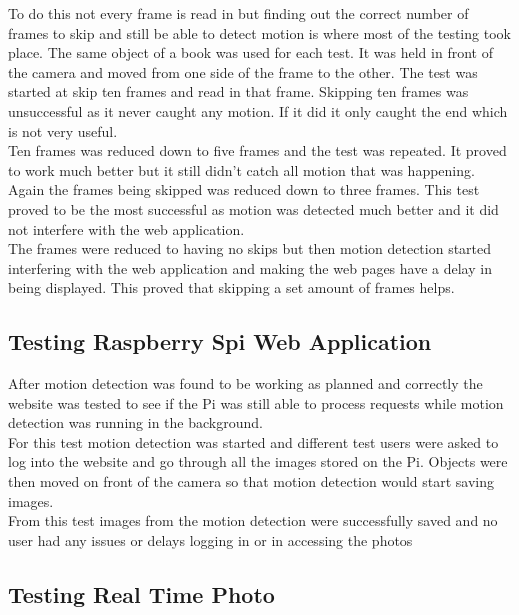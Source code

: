\documentclass[]{report}
\begin{document}
 To do this not every frame is read in but finding out the correct number of frames to skip and still be able to detect motion is where most of the testing took place. The same object of a book was used for each test. It was held in front of the camera and moved from one side of the frame to the other. The test was started at skip ten frames and read in that frame. Skipping ten frames was unsuccessful as it never caught any motion. If it did it only caught the end which is not very useful. \\

Ten frames was reduced down to five frames and the test was repeated. It proved to work much better but it still didn’t catch all motion that was happening. Again the frames being skipped was reduced down to three frames. This test proved to be the most successful as motion was detected much better and it did not interfere with the web application. \\

The frames were reduced to having no skips but then motion detection started interfering with the web application and making the web pages have a delay in being displayed. This proved that skipping a set amount of frames helps.\\

\subsection{Testing Raspberry Spi Web Application}
\label{subsec:websiteTest}
%
After motion detection was found to be working as planned and correctly the website was tested to see if the Pi was still able to process requests while motion detection was running in the background.\\

For this test motion detection was started and different test users were asked to log into the website and go through all the images stored on the Pi. Objects were then moved on front of the camera so that motion detection would start saving images.\\ 

From this test images from the motion detection were successfully saved and no user had any issues or delays logging in or in accessing the photos\\


\subsection{Testing Real Time Photo}
\label{subsec:realPhotoTest}
%
\end{document}
